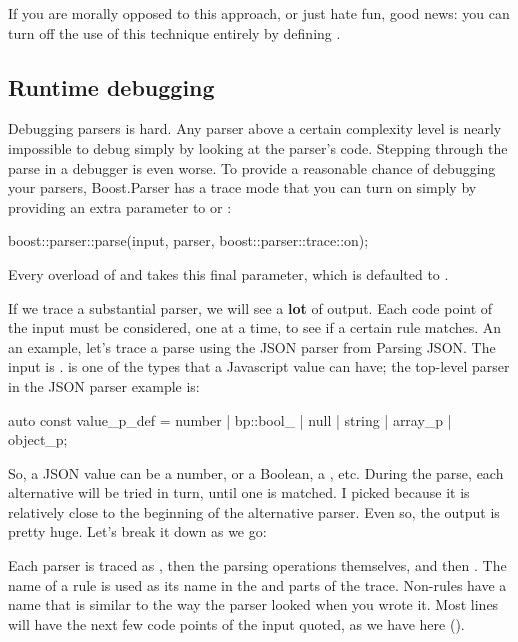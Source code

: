 \documentclass{MyBook}
\begin{document}
If you are morally opposed to this approach, or just hate fun, good news: you can turn off the use of this technique entirely by defining .

\subsection{Runtime debugging}

Debugging parsers is hard. Any parser above a certain complexity level is nearly impossible to debug simply by looking at the parser's code. Stepping through the parse in a debugger is even worse. To provide a reasonable chance of debugging your parsers, Boost.Parser has a trace mode that you can turn on simply by providing an extra parameter to  or :

\begin{code}
boost::parser::parse(input, parser, boost::parser::trace::on);
\end{code}

Every overload of  and  takes this final parameter, which is defaulted to .

If we trace a substantial parser, we will see a \textbf{lot} of output. Each code point of the input must be considered, one at a time, to see if a certain rule matches. An an example, let's trace a parse using the JSON parser from Parsing JSON. The input is .  is one of the types that a Javascript value can have; the top-level parser in the JSON parser example is:

\begin{code}
auto const value_p_def =
    number | bp::bool_ | null | string | array_p | object_p;
\end{code}

So, a JSON value can be a number, or a Boolean, a , etc. During the parse, each alternative will be tried in turn, until one is matched. I picked  because it is relatively close to the beginning of the  alternative parser. Even so, the output is pretty huge. Let's break it down as we go:

\begin{code}
[begin value; input="null"]
\end{code}

Each parser is traced as , then the parsing operations themselves, and then . The name of a rule is used as its name in the  and  parts of the trace. Non-rules have a name that is similar to the way the parser looked when you wrote it. Most lines will have the next few code points of the input quoted, as we have here ().
\end{document}
